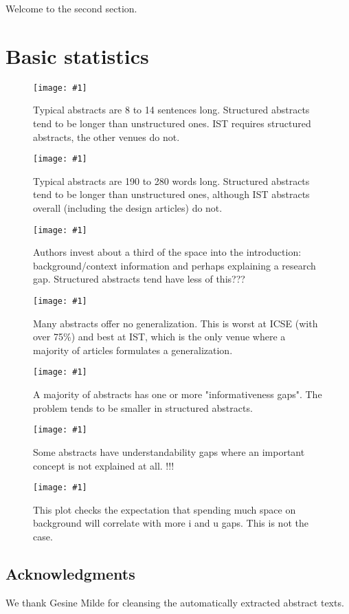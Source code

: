 \documentclass[journal]{IEEEtran}
\newcommand{\Plot}[2]{%
	\begin{figure}[!t]%
		\centering\texttt{[image: \#1]}%
		\vspace{-6mm}\caption{#2}\label{#1}%
	\end{figure}}
\begin{document}
\noindent Welcome to the second section.



\appendix
\section{Basic statistics}

\Plot{boxplots_sentences}{%
  Typical abstracts are 8 to 14 sentences long.
  Structured abstracts tend to be longer than unstructured ones.
  IST requires structured abstracts, the other venues do not.}
\Plot{boxplots_words}{%
  Typical abstracts are 190 to 280 words long. 
  Structured abstracts tend to be longer than unstructured ones, 
  although IST abstracts overall (including the design articles) do not.}
\Plot{boxplots_fraction_introduction}{%
  Authors invest about a third of the space into the introduction:
  background/context information and perhaps explaining a research gap.
  Structured abstracts tend have less of this???}
\Plot{boxplots_fraction_conclusion}{%
  Many abstracts offer no generalization.
  This is worst at ICSE (with over 75\%)
  and best at IST, which is the only venue where a majority of articles formulates a generalization.}
\Plot{boxplots_icount}{%
  A majority of abstracts has one or more "informativeness gaps".
  The problem tends to be smaller in structured abstracts.}
\Plot{boxplots_ucount}{%
  Some abstracts have understandability gaps where an important concept is not explained at all.
  !!!}
\Plot{lowess_gaps_by_fracintro}{%
	This plot checks the expectation that spending much space on background
	will correlate with more i and u gaps.
	This is not the case.}



\subsection{Acknowledgments}
\noindent We thank Gesine Milde for cleansing the automatically extracted abstract texts.




\end{document}
